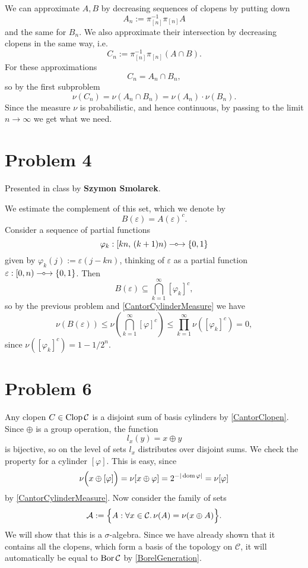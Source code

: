 We can approximate \( A, B \) by decreasing sequences of clopens by putting down
\[
    A_n := \pi_{[n]}^{-1} \pi_{[n]} A
\]
and the same for \( B_n \). We also approximate their intersection by decreasing clopens in the same way, i.e.
\[ 
    C_n := \pi_{[n]}^{-1} \pi_{[n]} (A \cap B).
\]
For these approximations
\[ 
    C_n = A_n \cap B_n, 
\]
so by the first subproblem
\[ 
    \nu(C_n) = \nu(A_n \cap B_n) = \nu(A_n) \cdot \nu(B_n).
\]
Since the measure \( \nu \) is probabilistic, and hence continuous, by passing to the limit \( n \to \infty \) we get what we need.

\section*{Problem 4}

Presented in class by \textbf{Szymon Smolarek}.

We estimate the complement of this set, which we denote by
\[ 
B(\varepsilon ) = A (\varepsilon )^c.
\]
Consider a sequence of partial functions
\[ 
    \varphi_k: [kn,\, (k+1)n) \multimap\mspace{-2mu}\to \left\{ 0,1 \right\}
\]
given by \( \varphi_k( j ) := \varepsilon(j - kn) \), thinking of \(\varepsilon \) as a partial function \(\varepsilon: [0,n) \multimap\mspace{-2mu}\to \left\{ 0,1 \right\} \). Then
\[ 
    B(\varepsilon ) \subseteq \bigcap_{k=1}^\infty \left[ \varphi_k \right]^c,
\]
so by the previous problem and \ref{CantorCylinderMeasure} we have
\[ 
    \nu(B(\varepsilon )) \leqslant \nu \left( \bigcap_{k=1}^\infty \left[ \varphi \right]^c \right) \leqslant \prod_{k=1}^\infty \nu \left( \left[ \varphi_k \right]^c \right) = 0,
\]
since \( \nu \left( \left[ \varphi_k \right]^c \right) = 1 - 1/2^n \).

\section*{Problem 6}

Any clopen \( C \in \operatorname{Clop} \mathcal{C} \) is a disjoint sum of basis cylinders by \ref{CantorClopen}. Since \( \oplus \) is a group operation, the function 
\[ 
    l_x(y) = x \oplus y 
\]
is bijective, so on the level of sets \( l_x \) distributes over disjoint sums. We check the property for a cylinder \( \left[ \varphi \right] \). This is easy, since
\[ 
    \nu \Bigl( x \oplus \left[ \varphi \right] \Bigr) = \nu[ x \oplus \varphi] = 2^{-|\operatorname{dom} \varphi|} = \nu [\varphi]
\]
by \ref{CantorCylinderMeasure}. Now consider the family of sets
\[ 
    \mathcal{A} := \Bigl\{ A : \forall x \in \mathcal{C}. \,\nu(A) = \nu(x \oplus A) \Bigr\}.
\]
We will show that this is a \( \sigma \)-algebra. Since we have already shown that it contains all the clopens, which form a basis of the topology on \( \mathcal{C} \), it will automatically be equal to \( \operatorname{Bor} \mathcal{C} \) by \ref{BorelGeneration}.

